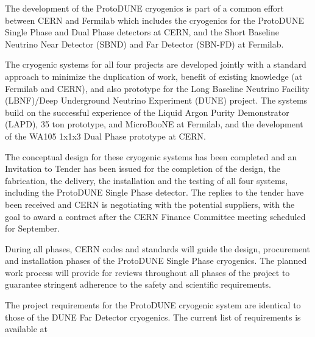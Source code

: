 The development of the ProtoDUNE cryogenics is part of a common effort between CERN and Fermilab which includes the cryogenics for the ProtoDUNE Single Phase and Dual Phase detectors at CERN, and the Short Baseline Neutrino Near Detector (SBND) and Far Detector (SBN-FD) at Fermilab.

The cryogenic systems for all four projects are developed jointly with a standard approach to minimize the duplication of work, benefit of existing knowledge (at Fermilab and CERN), and also prototype for the Long Baseline Neutrino Facility (LBNF)/Deep Underground Neutrino Experiment (DUNE) project. The systems build on the successful experience of the Liquid Argon Purity Demonstrator (LAPD), 35 ton prototype, and MicroBooNE at Fermilab, and the development of the WA105 1x1x3 Dual Phase prototype at CERN.

The conceptual design for these cryogenic systems has been completed and an Invitation to Tender has been issued for the completion of the design, the fabrication, the delivery, the installation and the testing of all four systems, including the ProtoDUNE Single Phase detector. The replies to the tender have been received and CERN is negotiating with the potential suppliers, with the goal to award a contract after the CERN Finance Committee meeting scheduled for September. 

During all phases, CERN codes and standards will guide the design, procurement and installation phases of the ProtoDUNE Single Phase cryogenics. The planned work process will provide for reviews throughout all phases of the project to guarantee stringent adherence to the safety and scientific requirements.




The project requirements for the ProtoDUNE cryogenic system are identical to those of the DUNE Far Detector cryogenics. The current list 
of requirements is available at \cite{DUNE_FD_cryogenics_req}

